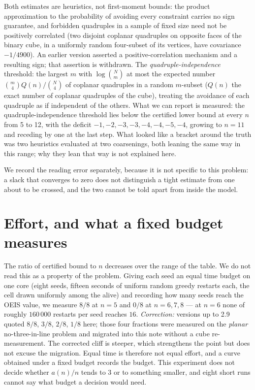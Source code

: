 \documentclass[11pt,a4paper]{article}
\begin{document}
Both estimates are heuristics, not first-moment bounds: the product approximation to the probability
of avoiding every constraint carries no sign guarantee, and forbidden quadruples in a sample of fixed
size need not be positively correlated (two disjoint coplanar quadruples on opposite faces of the
binary cube, in a uniformly random four-subset of its vertices, have covariance $-1/4900$).  An earlier
version asserted a positive-correlation mechanism and a resulting sign; that assertion is withdrawn.
The \emph{quadruple-independence} threshold: the largest $m$ with $\log\binom{N}{m}$ at most the expected number
$\binom{m}{4}Q(n)/\binom{N}{4}$ of coplanar quadruples in a random $m$-subset ($Q(n)$ the exact number of coplanar
quadruples of the cube), treating the avoidance of each quadruple as if independent of the others.  What we can
report is measured: the quadruple-independence threshold lies below the certified lower
bound at every $n$ from 5 to 12, with the deficit $-1,-2,-3,-3,-4,-4,-5,-4$, growing to $n=11$ and
receding by one at the last step.  What looked like a bracket around the truth was two heuristics
evaluated at two coarsenings, both leaning the same way in this range; why they lean that way is not
explained here.

We record the reading error separately, because it is not specific to this problem: a slack that
converges to zero does not distinguish a tight estimate from one about to be crossed, and the two
cannot be told apart from inside the model.

\section{Effort, and what a fixed budget measures}\label{s:effort}
The ratio of certified bound to $n$ decreases over the range of the table.  We do not read this
as a property of the problem.  Giving each seed an equal time budget on one core (eight seeds, fifteen seconds of uniform random
greedy restarts each, the cell drawn uniformly among the alive) and recording how many seeds reach
the OEIS value, we measure $8/8$ at $n=5$ and $0/8$ at $n=6,7,8$ --- at $n=6$ none of roughly
$160\,000$ restarts per seed reaches $16$.  \emph{Correction:} versions up to 2.9 quoted
$8/8$, $3/8$, $2/8$, $1/8$ here; those four fractions were measured on the \emph{planar}
no-three-in-line problem and migrated into this note without a cube re-measurement.  The corrected
cliff is steeper, which strengthens the point but does not excuse the migration.
Equal time is therefore not equal effort, and a curve obtained under a fixed budget records the
budget.  This experiment does not decide whether $a(n)/n$ tends to $3$ or to something smaller,
and eight short runs cannot say what budget a decision would need.
\end{document}
